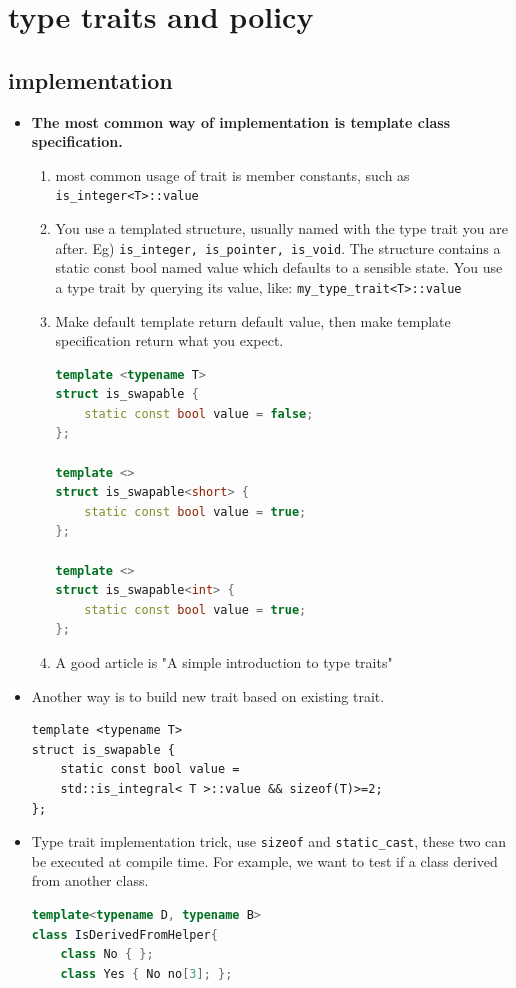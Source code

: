 \documentclass[a4paper,11pt,twoside]{book}
\begin{document}
\section{type traits and policy}
\subsection{implementation}
\begin{itemize}
	\item \textbf{The most common way of implementation is template class specification.}
	\begin{enumerate}
		\item most common usage of trait is member constants, such as \texttt{is\_integer<T>::value}
		
		\item You use a templated structure, usually named with the type trait you are after. Eg) \texttt{is\_integer, is\_pointer, is\_void}. The structure contains a static const bool named value which defaults to a sensible state. You use a type trait by querying its value, like: \texttt{my\_type\_trait<T>::value}
		
		\item Make default template return default value, then make template specification return what you expect. 
\begin{lstlisting}[frame=single, language=c++]
template <typename T>
struct is_swapable {
	static const bool value = false;
};
		
template <>
struct is_swapable<short> {
	static const bool value = true;
};
		
template <>
struct is_swapable<int> {
	static const bool value = true;
};
\end{lstlisting}
		\item A good article is "A simple introduction to type traits"
	\end{enumerate}
	
	\item Another way is to build new trait based on existing trait.
\begin{lstlisting}[numbers=none]
template <typename T>
struct is_swapable {
	static const bool value = 
	std::is_integral< T >::value && sizeof(T)>=2;
};
\end{lstlisting}
	
\item Type trait implementation trick, use \texttt{sizeof} and \texttt{static\_cast}, these two can be executed at compile time. For example, we want to test if a class derived from another class.
\begin{lstlisting}[frame=single, language=c++]
template<typename D, typename B>
class IsDerivedFromHelper{
	class No { };
	class Yes { No no[3]; };
	

\end{lstlisting}
\end{itemize}
\end{document}
